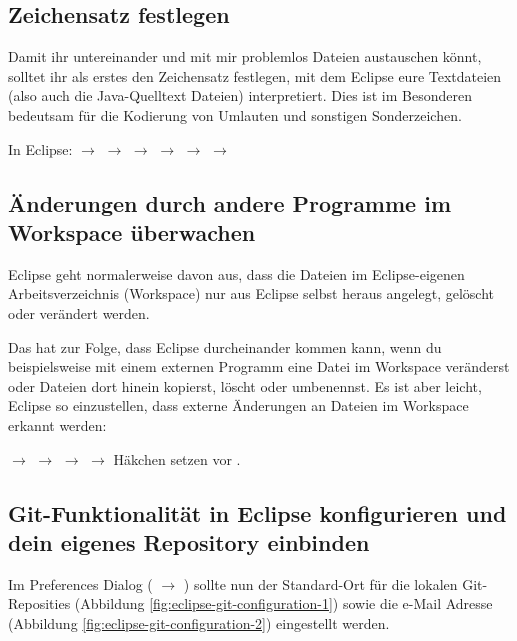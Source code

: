 \subsection{Zeichensatz festlegen}

Damit ihr untereinander und mit mir problemlos Dateien austauschen könnt,
solltet ihr als erstes den Zeichensatz festlegen, mit dem Eclipse eure
Textdateien (also auch die Java-Quelltext Dateien) interpretiert. Dies ist im
Besonderen bedeutsam für die Kodierung von Umlauten und sonstigen
Sonderzeichen.

In Eclipse:  $\rightarrow$  $\rightarrow$
 $\rightarrow$  $\rightarrow$  $\rightarrow$  $\rightarrow$ 

\subsection{Änderungen durch andere Programme im Workspace überwachen}

Eclipse geht normalerweise davon aus, dass die Dateien im Eclipse-eigenen
Arbeitsverzeichnis (Workspace) nur aus Eclipse selbst heraus angelegt, gelöscht
oder verändert werden.

Das hat zur Folge, dass Eclipse durcheinander kommen kann, wenn du
beispielsweise mit einem externen Programm eine Datei im Workspace veränderst
oder Dateien dort hinein kopierst, löscht oder umbenennst.
Es ist aber leicht, Eclipse so einzustellen, dass externe Änderungen an Dateien
im Workspace erkannt werden:

 $\rightarrow$  $\rightarrow$
 $\rightarrow$  $\rightarrow$
Häkchen setzen vor .

\subsection{Git-Funktionalität in Eclipse konfigurieren und dein eigenes
Repository einbinden}

Im Preferences Dialog ( $\rightarrow$ ) sollte
nun der Standard-Ort für die lokalen Git-Reposities (Abbildung
\ref{fig:eclipse-git-configuration-1}) sowie die e-Mail Adresse (Abbildung
\ref{fig:eclipse-git-configuration-2}) eingestellt
werden.

